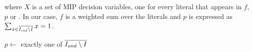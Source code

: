 where $X$ is a set of MIP decision variables, one for every literal that appears in $f$, $p$ or \setstohit. In our case, $f$ is a weighted sum over the literals and $p$ is expressed as $\sum_{x \in \overline{I_\mathit{end} \setminus I}} x = 1$.



\newcommand\onestepo{\ensuremath{\call{explain-One-Step-OCUS}}\xspace}
\begin{algorithm}[t]
  \DontPrintSemicolon
  
  \caption{$\onestepo(\formulac,f,I,\Iend)$}
  \label{alg:oneStepOCUS}
  $p \leftarrow$ exactly one of $\overline{I_\mathit{end} \setminus I}$\;
\end{algorithm}
\begin{algorithm}[t]
  \DontPrintSemicolon
  \caption{$\comus(\formula,f,p)$ }
  \label{alg:comus}
\end{algorithm}




